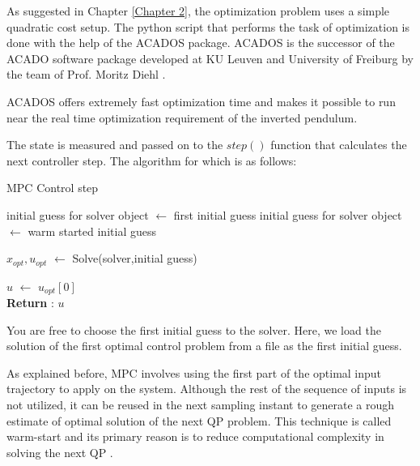 As suggested in Chapter \ref{Chapter 2}, the optimization problem uses a simple quadratic cost setup. The python script that performs the task of optimization is done with the help of the ACADOS package. ACADOS  is the successor of the ACADO software package developed at KU Leuven and University of Freiburg by the team of Prof. Moritz Diehl \cite{acados}.  

ACADOS offers extremely fast optimization time and makes it possible to run near the real time optimization requirement of the inverted pendulum. 

The state is measured and passed on to the $step()$ function that calculates the next controller step. The algorithm for which is as follows: 


\begin{algorithm}[H]
	\caption{MPC Control step}\label{alg:one}
	
	
	{
		initial guess for solver object $\gets$ first initial guess
	}
	{
		initial guess for solver object $\gets$ warm started initial guess
	}
	
	$x_{opt},u_{opt}$ $\gets$ Solve(solver,initial guess)
	
	$u$ $\gets$ $u_{opt}[0]$  \\ 
	
	\textbf{Return} : $u$
	
\end{algorithm}

You are free to choose the first initial guess to the solver. Here, we load the solution of the first optimal control problem from a file as the first initial guess. 

As explained before, MPC involves using the first part of the optimal input trajectory to apply on the system. Although the rest of the sequence of inputs is not utilized, it can be reused in the next sampling instant to generate a rough estimate of optimal solution of the next QP problem. This technique is called warm-start and its primary reason is to reduce computational complexity in solving the next QP \cite{Otta2015}.


